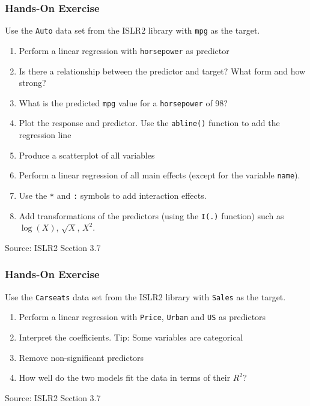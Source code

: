 \begin{tcolorbox}[colback=code]
\subsubsection*{Hands-On Exercise} 
\noindent Use the \texttt{Auto} data set from the ISLR2 library with \texttt{mpg} as the target.
  \begin{enumerate}
     \item Perform a linear regression with \texttt{horsepower} as predictor
     \item Is there a relationship between the predictor and target? What form and how strong?
     \item What is the predicted \texttt{mpg} value for a \texttt{horsepower} of 98? 
     \item Plot the response and predictor. Use the \texttt{abline()} function to add the regression line
     \item Produce a scatterplot of all variables
     \item Perform a linear regression of all main effects (except for the variable \texttt{name}).
     \item Use the \texttt{*} and \texttt{:} symbols to add interaction effects.
     \item Add transformations of the predictors (using the \texttt{I(.)} function) such as $\log(X)$, $\sqrt{X}$, $X^2$.
  \end{enumerate}

{\footnotesize \vspace{\baselineskip} Source: ISLR2 Section 3.7}
\end{tcolorbox}

\begin{tcolorbox}[colback=code]
\subsubsection*{Hands-On Exercise} 
\noindent Use the \texttt{Carseats} data set from the ISLR2 library with \texttt{Sales} as the target.
  \begin{enumerate}
     \item Perform a linear regression with \texttt{Price}, \texttt{Urban} and \texttt{US} as predictors
     \item Interpret the coefficients. Tip: Some variables are categorical
     \item Remove non-significant predictors
     \item How well do the two models fit the data in terms of their $R^2$?
  \end{enumerate}

{\footnotesize \vspace{\baselineskip} Source: ISLR2 Section 3.7}
\end{tcolorbox}

